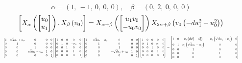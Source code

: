 \documentclass[11pt]{article}
\theoremstyle{definition}
\begin{document}
\[
\alpha = \left( 1, \  -1, \  0, \  0, \  0\right), \quad \beta = \left( 0, \  2, \  0, \  0, \  0\right)
\]
\[
\scaletoalign{\textwidth}{\left[ X_{\alpha}\left(\left[\begin{matrix}u_{0}\\u_{1}\end{matrix}\right]\right), X_{\beta}\left(v_{0}\right) \right] = X_{\alpha + \beta}\left(\left[\begin{matrix}u_{1} v_{0}\\- u_{0} v_{0}\end{matrix}\right]\right) X_{2\alpha + \beta}\left(v_{0} \left(- d u_{1}^{2} + u_{0}^{2}\right)\right)}
\]
\[
\scaletoalign{\textwidth}{{\left[\begin{matrix}1 & \sqrt{d} u_{1} + u_{0} & 0 & 0 & 0\\0 & 1 & 0 & 0 & 0\\0 & 0 & 1 & 0 & 0\\0 & 0 & \sqrt{d} u_{1} - u_{0} & 1 & 0\\0 & 0 & 0 & 0 & 1\end{matrix}\right]} {\left[\begin{matrix}1 & 0 & 0 & 0 & 0\\0 & 1 & 0 & - v_{0} & 0\\0 & 0 & 1 & 0 & 0\\0 & 0 & 0 & 1 & 0\\0 & 0 & 0 & 0 & 1\end{matrix}\right]} {\left[\begin{matrix}1 & - \sqrt{d} u_{1} - u_{0} & 0 & 0 & 0\\0 & 1 & 0 & 0 & 0\\0 & 0 & 1 & 0 & 0\\0 & 0 & - \sqrt{d} u_{1} + u_{0} & 1 & 0\\0 & 0 & 0 & 0 & 1\end{matrix}\right]} {\left[\begin{matrix}1 & 0 & 0 & 0 & 0\\0 & 1 & 0 & v_{0} & 0\\0 & 0 & 1 & 0 & 0\\0 & 0 & 0 & 1 & 0\\0 & 0 & 0 & 0 & 1\end{matrix}\right]} = {\left[\begin{matrix}1 & 0 & v_{0} \left(d u_{1}^{2} - u_{0}^{2}\right) & - v_{0} \left(\sqrt{d} u_{1} + u_{0}\right) & 0\\0 & 1 & v_{0} \left(\sqrt{d} u_{1} - u_{0}\right) & 0 & 0\\0 & 0 & 1 & 0 & 0\\0 & 0 & 0 & 1 & 0\\0 & 0 & 0 & 0 & 1\end{matrix}\right]}}
\]
\end{document}
